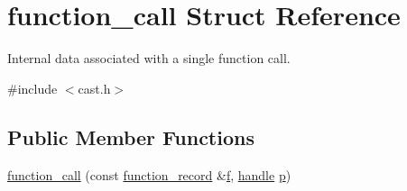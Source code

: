 \hypertarget{structfunction__call}{}\section{function\+\_\+call Struct Reference}
\label{structfunction__call}


Internal data associated with a single function call.  




{\ttfamily \#include $<$cast.\+h$>$}

\subsection*{Public Member Functions}
\begin{DoxyCompactItemize}
\item 
\mbox{\hyperlink{structfunction__call_a7e92652f2171a83f7d690f57983c1631}{function\+\_\+call}} (const \mbox{\hyperlink{structfunction__record}{function\+\_\+record}} \&\mbox{\hyperlink{_s_d_l__opengl__glext_8h_a691492ec0bd6383f91200e49f6ae40ed}{f}}, \mbox{\hyperlink{classhandle}{handle}} \mbox{\hyperlink{_s_d_l__opengl__glext_8h_aa5367c14d90f462230c2611b81b41d23}{p}})
\end{DoxyCompactItemize}
